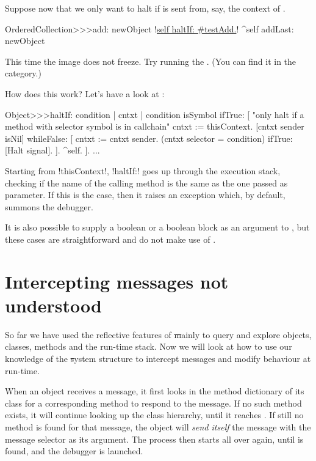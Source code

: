\documentclass[a4paper,10pt,twoside]{book}
\begin{document}
Suppose now that we only want to halt if  is sent from, say, the context of .

\begin{code}{}
OrderedCollection>>>add: newObject
        !\underline{self haltIf: \#testAdd.}!
        ^self addLast: newObject
\end{code}

This time the image does not freeze. Try running the .
(You can find it in the  category.)

How does this work?  Let's have a look at :
\begin{code}{}
Object>>>haltIf: condition
        | cntxt |
        condition isSymbol ifTrue: [
                "only halt if a method with selector symbol is in callchain"
                cntxt := thisContext.
                [cntxt sender isNil] whileFalse: [
                        cntxt := cntxt sender.
                        (cntxt selector = condition) ifTrue: [Halt signal]. ].
                ^self.
        ].
        ...
\end{code}

Starting from \ct!thisContext!, \ct!haltIf:! goes up through the execution stack, checking if the name of the calling method is the same as the one passed as parameter.
If this is the case, then it raises an exception which, by default, summons the debugger.

It is also possible to supply a boolean or a boolean block as an argument to , but these cases are straightforward and do not make use of .

\section{Intercepting messages not understood}

So far we have used the reflective features of \st mainly to query and explore objects, classes, methods and the run-time stack. Now we will look at how to use our knowledge of the \st system structure to intercept messages and modify behaviour at run-time.

When an object receives a message, it first looks in the method dictionary of its class for a corresponding method to respond to the message.
If no such method exists, it will continue looking up the class hierarchy, until it reaches . If still no method is found for that message, the object will \emph{send itself} the message  with the message selector as its argument.
The process then starts all over again, until  is found, and the debugger is launched.
\end{document}
